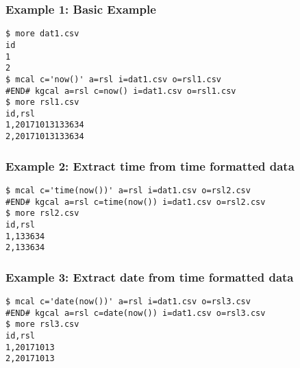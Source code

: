 \subsubsection*{Example 1: Basic Example}



\begin{Verbatim}[baselinestretch=0.7,frame=single]
$ more dat1.csv
id
1
2
$ mcal c='now()' a=rsl i=dat1.csv o=rsl1.csv
#END# kgcal a=rsl c=now() i=dat1.csv o=rsl1.csv
$ more rsl1.csv
id,rsl
1,20171013133634
2,20171013133634
\end{Verbatim}
\subsubsection*{Example 2: Extract time from time formatted data}



\begin{Verbatim}[baselinestretch=0.7,frame=single]
$ mcal c='time(now())' a=rsl i=dat1.csv o=rsl2.csv
#END# kgcal a=rsl c=time(now()) i=dat1.csv o=rsl2.csv
$ more rsl2.csv
id,rsl
1,133634
2,133634
\end{Verbatim}
\subsubsection*{Example 3: Extract date from time formatted data}



\begin{Verbatim}[baselinestretch=0.7,frame=single]
$ mcal c='date(now())' a=rsl i=dat1.csv o=rsl3.csv
#END# kgcal a=rsl c=date(now()) i=dat1.csv o=rsl3.csv
$ more rsl3.csv
id,rsl
1,20171013
2,20171013
\end{Verbatim}
